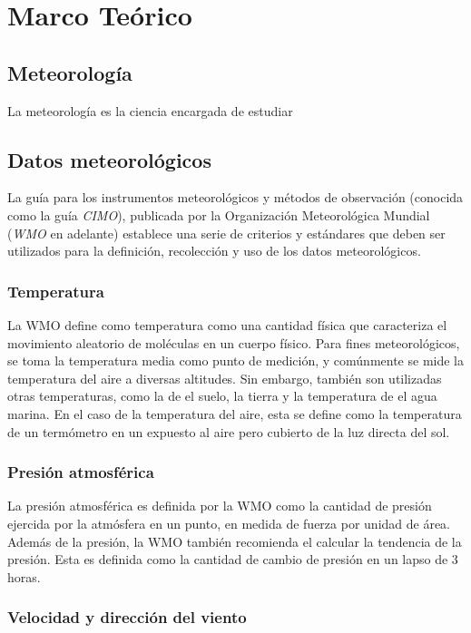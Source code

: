 \section{Marco Teórico}

\subsection{Meteorología}

La meteorología es la ciencia encargada de estudiar

\subsection{Datos meteorológicos}

La guía para los instrumentos meteorológicos y métodos de observación (conocida como la guía \textit{CIMO}), publicada por la Organización Meteorológica Mundial (\textit{WMO} en adelante) establece una serie de criterios y estándares \cite{CIMO_2008} que deben ser utilizados para la definición, recolección y uso de los datos meteorológicos.

\subsubsection{Temperatura}
La WMO \cite{CIMO_2008} define como temperatura como una cantidad física que caracteriza el movimiento aleatorio de moléculas en un cuerpo físico. Para fines meteorológicos, se toma la temperatura media como punto de medición, y comúnmente se mide la temperatura del aire a diversas altitudes. Sin embargo, también son utilizadas otras temperaturas, como la de el suelo, la tierra y la temperatura de el agua marina. En el caso de la temperatura del aire, esta se define como la temperatura de un termómetro en un expuesto al aire pero cubierto de la luz directa del sol.

\subsubsection{Presión atmosférica}

La presión atmosférica es definida por la WMO \cite{CIMO_2008} como la cantidad de presión ejercida por la atmósfera en un punto, en medida de fuerza por unidad de área. Además de la presión, la WMO también recomienda el calcular la tendencia de la presión. Esta es definida como la cantidad de cambio de presión en un lapso de 3 horas.

\subsubsection{Velocidad y dirección del viento}

